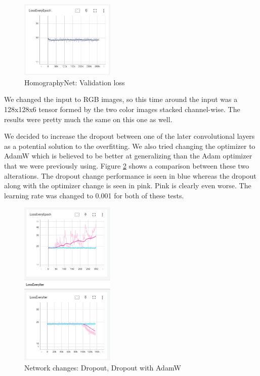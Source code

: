 \documentclass[conference]{IEEEtran}
\begin{document}
\begin{figure}[!htbp]
  \centering
  \includegraphics[width=0.4\textwidth]{phase1/first_validation_loss.png}
  \caption{HomographyNet: Validation loss}
  \label{fig:HNet validation loss}
\end{figure}

We changed the input to RGB images, so this time around the input was a 128x128x6 tensor formed by the two color images stacked channel-wise. The results were pretty much the same on this one as well.

We decided to increase the dropout between one of the later convolutional layers as a potential solution to the overfitting. We also tried changing the optimizer to AdamW which is believed to be better at generalizing than the Adam optimizer that we were previously using. Figure \ref{fig:network_changes} shows a comparison between these two alterations. The dropout change performance is seen in blue whereas the dropout along with the optimizer change is seen in pink. Pink is clearly even worse.  The learning rate was changed to 0.001 for both of these tests.

\begin{figure}[!htbp]
  \centering
  \includegraphics[width=0.4\textwidth]{phase1/dropout_vs_adamw.png}
  \caption{Network changes: Dropout, Dropout with AdamW}
  \label{fig:network_changes}
\end{figure}
\end{document}
